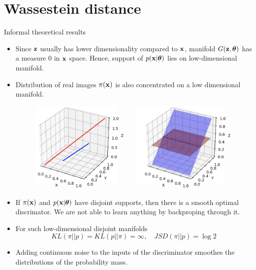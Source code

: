 \section{Wassestein distance}
\begin{frame}{Informal theoretical results}
	\begin{itemize}
		\footnotesize
		\item Since $\mathbf{z}$ usually has lower dimensionality compared to $\mathbf{x}$, manifold $G(\mathbf{z}, \boldsymbol{\theta})$ has a measure 0 in $\mathbf{x}$ space. Hence, support of $p(\mathbf{x} | \boldsymbol{\theta})$ lies on low-dimensional manifold.
		\item Distribution of real images $\pi(\mathbf{x})$ is also concentrated on a low dimensional manifold.
		\begin{figure}
			\centering
			\includegraphics[width=0.5\linewidth]{figs/low_dim_manifold}
		\end{figure}
		\item If $\pi(\mathbf{x})$ and $p(\mathbf{x} | \boldsymbol{\theta})$ have disjoint supports, then there is a smooth optimal discrimator. We are not able to learn anything by backproping through it.
		\item For such low-dimensional disjoint manifolds
		\vspace{-0.1cm}
		\[
			KL(\pi || p) = KL(p || \pi) = \infty, \quad JSD(\pi || p) = \log 2
		\]
		\vspace{-0.7cm}
		\item Adding continuous noise to the inputs of the discriminator smoothes the distributions of the probability mass.
	\end{itemize}
\end{frame}
